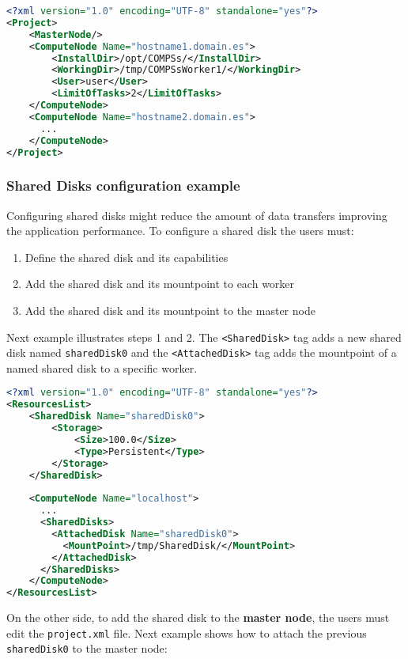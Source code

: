 \newpage

\begin{lstlisting}[language=xml]
<?xml version="1.0" encoding="UTF-8" standalone="yes"?>                                                                                                                                                            
<Project>
    <MasterNode/>
    <ComputeNode Name="hostname1.domain.es">
        <InstallDir>/opt/COMPSs/</InstallDir>
        <WorkingDir>/tmp/COMPSsWorker1/</WorkingDir>
        <User>user</User>
        <LimitOfTasks>2</LimitOfTasks>
    </ComputeNode>
    <ComputeNode Name="hostname2.domain.es">
      ...
    </ComputeNode>
</Project>
\end{lstlisting}


\subsubsection{Shared Disks configuration example}
Configuring shared disks might reduce the amount of data transfers improving the application performance. To configure a 
shared disk the users must:
\begin{enumerate}
 \item Define the shared disk and its capabilities
 \item Add the shared disk and its mountpoint to each worker
 \item Add the shared disk and its mountpoint to the master node
\end{enumerate}

Next example illustrates steps 1 and 2. The \texttt{<SharedDisk>} tag adds a new shared disk named \texttt{sharedDisk0} and the
\texttt{<AttachedDisk>} tag adds the mountpoint of a named shared disk to a specific worker.
\begin{lstlisting}[language=xml]
<?xml version="1.0" encoding="UTF-8" standalone="yes"?>
<ResourcesList>
    <SharedDisk Name="sharedDisk0">
        <Storage>
            <Size>100.0</Size>
            <Type>Persistent</Type>
        </Storage>
    </SharedDisk>
    
    <ComputeNode Name="localhost">
      ...
      <SharedDisks>
        <AttachedDisk Name="sharedDisk0">
          <MountPoint>/tmp/SharedDisk/</MountPoint>
        </AttachedDisk>
      </SharedDisks>
    </ComputeNode>
</ResourcesList>
\end{lstlisting} 

On the other side, to add the shared disk to the \textbf{master node}, the users must edit the \texttt{project.xml} file. Next example
shows how to attach the previous \texttt{sharedDisk0} to the master node:

